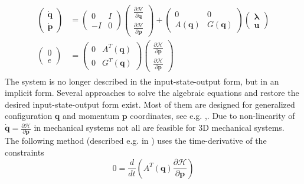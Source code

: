 \documentclass[a4paper,twoside, openright,12pt]{report}
\newcommand{\f}[1]{\boldsymbol{#1}}
\begin{document}
\begin{eqnarray}\label{EQ:PHSpconstrained}
\begin{aligned}
\begin{pmatrix}
\dot{\f{q}} \\ \dot{\f{p}} \end{pmatrix} &= 
\begin{pmatrix} 0 & I \\ -I & 0\end{pmatrix}
\begin{pmatrix}
\frac{\partial \mathcal{H}}{\partial \f{q}} \\ \frac{\partial \mathcal{H}}{\partial \f{p}}\end{pmatrix}
+ \begin{pmatrix}0 & 0 \\ A(\f{q}) & G(\f{q})\end{pmatrix}
\begin{pmatrix}\boldsymbol{\lambda} \\ \f{u}\end{pmatrix}
\\
\begin{pmatrix}0 \\ e\end{pmatrix} &=
\begin{pmatrix}0 & A^T(\f{q}) \\ 0 & G^T(\f{q})\end{pmatrix}
\begin{pmatrix}
\frac{\partial \mathcal{H}}{\partial \f{p}} \\ \frac{\partial \mathcal{H}}{\partial \f{p}}\end{pmatrix}
\end{aligned}
\end{eqnarray}
The system is no longer described in the input-state-output form, but in an implicit form. Several approaches to solve the algebraic equations and restore the desired input-state-output form exist. Most of them are designed for generalized configuration $\f{q}$ and momentum $\f{p}$ coordinates, see e.g. \cite{Schaft_13},\cite{Duindam_09}. Due to non-linearity of $\dot{\f{q}}=\frac{\partial \mathcal{H}}{\partial \f{p}}$ in mechanical systems not all are feasible for $3$D mechanical systems. \\
The following method (described e.g. in \cite{Duindam_09}) uses the time-derivative of the constraints
\begin{equation}\label{EQ:constraintderivative}
0 = \frac{d}{dt}\left(A^T(\f{q})\frac{\partial \mathcal{H}}{\partial \f{p}}\right)
\end{equation}
\end{document}
